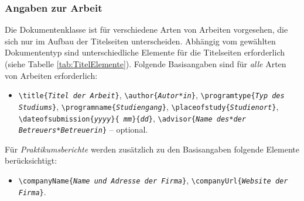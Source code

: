 \subsubsection{Angaben zur Arbeit}

Die Dokumentenklasse ist für verschiedene Arten von Arbeiten vorgesehen, die
sich nur im Aufbau der Titelseiten unterscheiden. Abhängig vom gewählten
Dokumententyp sind unterschiedliche Elemente für die Titelseiten erforderlich
(siehe Tabelle \ref{tab:TitelElemente}). Folgende Basisangaben sind für
\emph{alle} Arten von Arbeiten erforderlich:
%
\begin{itemize}
    \item[] %
    \verb!\title{!\texttt{\em Titel der Arbeit}\verb!}!, \newline%
    \verb!\author{!\texttt{\em Autor*in}\verb!}!, \newline%
    \verb!\programtype{!\texttt{\em Typ des Studiums}\verb!}!, \newline%
    \verb!\programname{!\texttt{\em Studiengang}\verb!}!, \newline%
    \verb!\placeofstudy{!\texttt{\em Studienort}\verb!}!, \newline%
    \verb!\dateofsubmission{!\texttt{\em yyyy}\verb!}{!\texttt{\em
    mm}\verb!}{!\texttt{\em dd}\verb!}!, \newline%
    \verb!\advisor{!\texttt{\em Name des*der Betreuers*Betreuerin}\verb!}! --
    optional.
\end{itemize}
%
\noindent
Für \emph{Praktikumsberichte} werden zusätzlich zu den Basisangaben
folgende Elemente berücksichtigt:
%
\begin{itemize}
    \item[] %
    \verb!\companyName{!\texttt{\em Name und Adresse der Firma}\verb!}!,
    \newline%
    \verb!\companyUrl{!\texttt{\em Website der Firma}\verb!}!.
\end{itemize}

